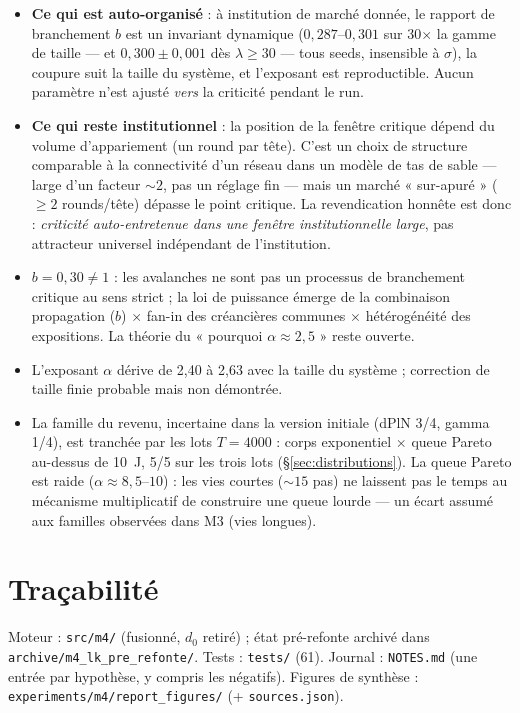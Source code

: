 \documentclass[11pt,a4paper]{article}
\newcommand{\code}[1]{\texttt{#1}}
\begin{document}
\begin{itemize}[nosep]
\item \textbf{Ce qui est auto-organisé} : à institution de marché donnée,
  le rapport de branchement $b$ est un invariant dynamique
  ($0{,}287$--$0{,}301$ sur 30$\times$ la gamme de taille --- et
  $0{,}300 \pm 0{,}001$ dès $\lambda \ge 30$ --- tous seeds, insensible à
  $\sigma$), la coupure suit la taille du système, et l'exposant est
  reproductible. Aucun paramètre n'est ajusté \emph{vers} la criticité
  pendant le run.
\item \textbf{Ce qui reste institutionnel} : la position de la fenêtre
  critique dépend du volume d'appariement (un round par tête). C'est un
  choix de structure comparable à la connectivité d'un réseau dans un
  modèle de tas de sable --- large d'un facteur ${\sim}2$, pas un réglage
  fin --- mais un marché « sur-apuré » ($\ge 2$ rounds/tête) dépasse le
  point critique. La revendication honnête est donc : \emph{criticité
  auto-entretenue dans une fenêtre institutionnelle large}, pas attracteur
  universel indépendant de l'institution.
\item $b = 0{,}30 \ne 1$ : les avalanches ne sont pas un processus de
  branchement critique au sens strict ; la loi de puissance émerge de la
  combinaison propagation ($b$) $\times$ fan-in des créancières communes
  $\times$ hétérogénéité des expositions. La théorie du « pourquoi
  $\alpha \approx 2{,}5$ » reste ouverte.
\item L'exposant $\alpha$ dérive de 2,40 à 2,63 avec la taille du système ;
  correction de taille finie probable mais non démontrée.
\item La famille du revenu, incertaine dans la version initiale (dPlN
  3/4, gamma 1/4), est tranchée par les lots $T{=}4000$ : corps
  exponentiel $\times$ queue Pareto au-dessus de 10~J, 5/5 sur les trois
  lots (§\ref{sec:distributions}). La queue Pareto est raide
  ($\alpha \approx 8{,}5$--$10$) : les vies courtes (${\sim}15$ pas) ne
  laissent pas le temps au mécanisme multiplicatif de construire une
  queue lourde --- un écart assumé aux familles observées dans M3 (vies
  longues).
\end{itemize}

\section{Traçabilité}

Moteur : \code{src/m4/} (fusionné, $d_0$ retiré) ; état pré-refonte archivé
dans \code{archive/m4\_lk\_pre\_refonte/}. Tests : \code{tests/} (61).
Journal : \code{NOTES.md} (une entrée par hypothèse, y compris les
négatifs). Figures de synthèse :
\code{experiments/m4/report\_figures/} (+ \code{sources.json}).
\end{document}
